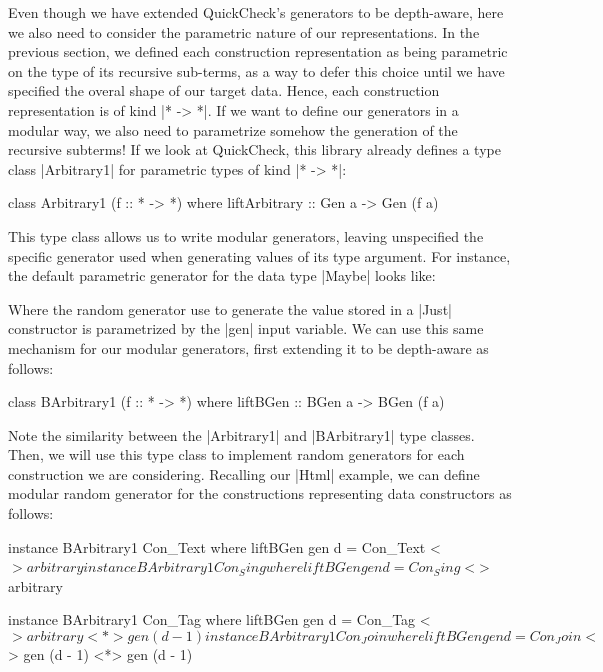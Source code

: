 Even though we have extended QuickCheck's generators to be depth-aware, here we
also need to consider the parametric nature of our representations.
%
In the previous section, we defined each construction representation as being
parametric on the type of its recursive sub-terms, as a way to defer this choice
until we have specified the overal shape of our target data.
%
Hence, each construction representation is of kind |* -> *|.
%
If we want to define our generators in a modular way, we also need to
parametrize somehow the generation of the recursive subterms!
%
If we look at QuickCheck, this library already defines a type class |Arbitrary1|
for parametric types of kind |* -> *|:

\begin{code}
class Arbitrary1 (f :: * -> *) where
  liftArbitrary :: Gen a -> Gen (f a)
\end{code}

This type class allows us to write modular generators, leaving unspecified the
specific generator used when generating values of its type argument.
%
For instance, the default parametric generator for the data type |Maybe| looks
like:


Where the random generator use to generate the value stored in a |Just|
constructor is parametrized by the |gen| input variable.
%
We can use this same mechanism for our modular generators, first extending it to
be depth-aware as follows:

\begin{code}
class BArbitrary1 (f :: * -> *) where
  liftBGen :: BGen a -> BGen (f a)
\end{code}
%
Note the similarity between the |Arbitrary1| and |BArbitrary1| type classes.
%
Then, we will use this type class to implement random generators for each
construction we are considering.
%
Recalling our |Html| example, we can define modular random generator for the
constructions representing data constructors as follows:

\begin{code}
instance BArbitrary1 Con_Text where
  liftBGen gen d = Con_Text <$> arbitrary

instance BArbitrary1 Con_Sing where
  liftBGen gen d = Con_Sing <$> arbitrary

instance BArbitrary1 Con_Tag where
  liftBGen gen d = Con_Tag <$> arbitrary <*> gen (d - 1)

instance BArbitrary1 Con_Join where
  liftBGen gen d = Con_Join <$> gen (d - 1) <*> gen (d - 1)
\end{code} %

